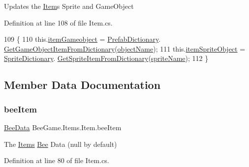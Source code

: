 Updates the \hyperlink{struct_bee_game_1_1_items_1_1_item}{Item}\textquotesingle{}s Sprite and Game\+Object 



Definition at line 108 of file Item.\+cs.


\begin{DoxyCode}
109         \{
110             this.\hyperlink{struct_bee_game_1_1_items_1_1_item_af28a8cd4a0eff9d4c18189c5ab525f18}{itemGameobject} = \hyperlink{class_bee_game_1_1_core_1_1_prefab_dictionary}{PrefabDictionary}.
      \hyperlink{class_bee_game_1_1_core_1_1_prefab_dictionary_a5435ea289663e612fc964438691e32d0}{GetGameObjectItemFromDictionary}(\hyperlink{struct_bee_game_1_1_items_1_1_item_ade55c08e49c1c4017c91978119876387}{objectName});
111             this.\hyperlink{struct_bee_game_1_1_items_1_1_item_abd1dd5d605d0768bce6402f64f5cb699}{itemSpriteObject} = \hyperlink{class_bee_game_1_1_core_1_1_sprite_dictionary}{SpriteDictionary}.
      \hyperlink{class_bee_game_1_1_core_1_1_sprite_dictionary_a17fca1828cb89197a540e2e7ab0c43cd}{GetSpriteItemFromDictionary}(\hyperlink{struct_bee_game_1_1_items_1_1_item_a268ba3cca2e9fa79fb5aff3c880f6505}{spriteName});
112         \}
\end{DoxyCode}


\subsection{Member Data Documentation}
\mbox{\label{struct_bee_game_1_1_items_1_1_item_a0593f3b7b3ff5daa864f3c6d0ccd77ca}} 
\subsubsection{\texorpdfstring{bee\+Item}{beeItem}}
{\footnotesize\ttfamily \hyperlink{struct_bee_game_1_1_bee_1_1_bee_data}{Bee\+Data} Bee\+Game.\+Items.\+Item.\+bee\+Item}



The \hyperlink{namespace_bee_game_1_1_items}{Items} \hyperlink{namespace_bee_game_1_1_bee}{Bee} Data (null by default) 



Definition at line 80 of file Item.\+cs.

\mbox{\label{struct_bee_game_1_1_items_1_1_item_a3173b5fb0a51e9063335e5cbf93c2e1b}} 
